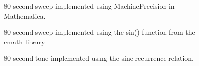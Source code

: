 \documentclass[10pt]{article}
\begin{document}
\begin{figure} \begin{center} \setlength\fboxrule{0.01in}\end{center} \caption{80-second sweep implemented using MachinePrecision in Mathematica.} \end{figure}


\begin{figure} \begin{center} \setlength\fboxrule{0.01in}\end{center} \caption{80-second sweep implemented using the sin() function from the cmath library.} \end{figure}


\begin{figure} \begin{center} \setlength\fboxrule{0.01in}\end{center} \caption{80-second tone implemented using the sine recurrence relation.} \end{figure}
\end{document}

